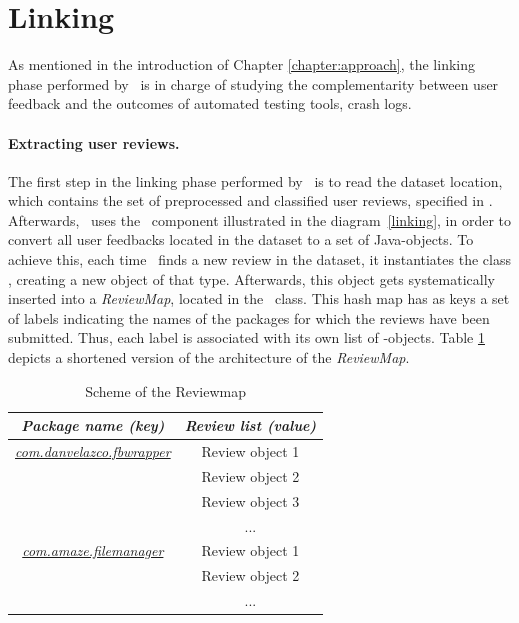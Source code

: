 \section{Linking}
\label{tool: linking}
As mentioned in the introduction of Chapter \ref{chapter:approach}, the linking phase performed by \toolname\ is in charge of studying the complementarity between user feedback and the outcomes of automated testing tools, \ie crash logs. 



\paragraph{Extracting user reviews.} 
The first step in the linking phase performed by \toolname\, is to read the dataset location, which contains the set of preprocessed and classified user reviews, specified in \Config.
Afterwards, \toolname\ uses the \ReviewC\ component illustrated in the diagram~\ref{linking}, in order to convert all user feedbacks located in the dataset to a set of Java-objects. 
To achieve this, each time \toolname\ finds a new review in the dataset, it instantiates the class \Review, creating a new object of that type. 
Afterwards, this object gets systematically inserted into a \textit{ReviewMap}, located in the \ReviewC\ class. 
This hash map has as keys a set of labels indicating the names of the packages for which the reviews have been submitted. Thus, each label is associated with its own list of \Review-objects. 
Table \ref{tbl: reviewmap} depicts a shortened version of the architecture of the \textit{ReviewMap}.
\begin{table}[tb]
\centering
\caption{Scheme of the Reviewmap}
\label{tbl: reviewmap}
\begin{tabular}{c|c|}
\hline
\multicolumn{1}{|c|}{\textit{\textbf{Package name (key)}}}    & \textit{\textbf{Review list (value)}} \\ \hline
\multicolumn{1}{|c|}{{\ul \textit{com.danvelazco.fbwrapper}}} & Review object 1                       \\ \hline
                                                              & Review object 2                       \\ \cline{2-2} 
                                                              & Review object 3                       \\ \cline{2-2} 
                                                              & ...                                   \\ \hline
\multicolumn{1}{|c|}{{\ul \textit{com.amaze.filemanager}}}    & Review object 1                       \\ \hline
                                                              & Review object 2                       \\ \cline{2-2} 
                                                              & ...                                   \\ \cline{2-2} 
\end{tabular}
\end{table}
